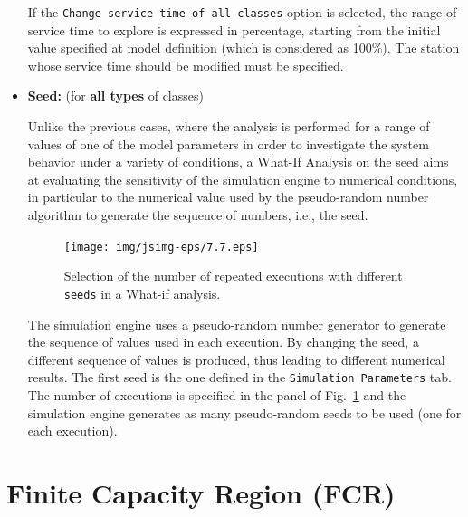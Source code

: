 \begin{itemize}
If the \texttt{Change service time of all classes} option is
selected, the range of service time to explore is expressed in
percentage, starting from the initial value specified at model
definition (which is considered as 100\%). The station whose
service time should be modified must be specified.

\item \textbf{Seed:} (for \textbf{all types} of classes)

Unlike the previous cases, where the analysis is performed for a
range of values of one of the model parameters in order to
investigate the system behavior under a variety of conditions, a
What-If Analysis on the seed aims at evaluating the sensitivity of
the simulation engine to numerical conditions, in particular to
the numerical value used by the pseudo-random number algorithm to
generate the sequence of numbers, i.e., the seed.
\begin{figure}[hbt]
    \begin{center}
        \texttt{[image: img/jsimg-eps/7.7.eps]}
    \end{center}
    \caption{Selection of the number of repeated executions with
    different \texttt{seeds} in a What-if analysis.}
    \label{fig:selseed}
\end{figure}
The simulation engine uses a pseudo-random number generator to
generate the sequence of values used in each execution. By
changing the seed, a different sequence of values is produced,
thus leading to different numerical results. The first seed is the
one defined in the \texttt{Simulation Parameters} tab. The number
of executions is specified in the panel of Fig.~\ref{fig:selseed}
and the simulation engine generates as many pseudo-random seeds to
be used (one for each execution).
\end{itemize}

\section{Finite Capacity Region (FCR)}
\label{defcap}


